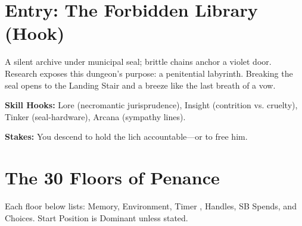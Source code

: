 \documentclass[18pt, letterpaper, twoside]{article}
\begin{document}
\section{Entry: The Forbidden Library (Hook)}
A silent archive under municipal seal; brittle chains anchor a violet door. Research exposes this dungeon's purpose: a penitential labyrinth. Breaking the seal opens to the Landing Stair and a breeze like the last breath of a vow.

\textbf{Skill Hooks:} Lore (necromantic jurisprudence), Insight (contrition vs. cruelty), Tinker (seal-hardware), Arcana (sympathy lines).

\textbf{Stakes:} You descend to hold the lich accountable---or to free him.

\section{The 30 Floors of Penance}

Each floor below lists: Memory, Environment, Timer , Handles, SB Spends, and Choices. Start Position is Dominant unless stated.
\end{document}

